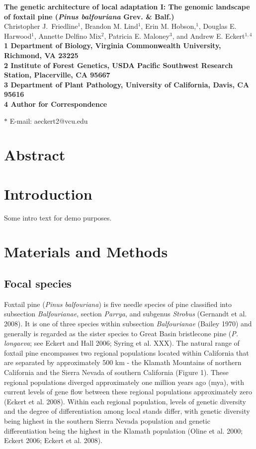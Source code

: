 \documentclass[11pt]{article}
\begin{document}
\begin{flushleft} 
{\Large \textbf{The genetic architecture of local adaptation I: The genomic landscape of foxtail 
pine (\textit{Pinus balfouriana} Grev. \& Balf.)}}
\\
Christopher J.\ Friedline$^{1}$, 
Brandon M. Lind$^{1}$,
Erin M. Hobson,$^{1}$,
Douglas E. Harwood$^{1}$, 
Annette Delfino Mix$^{2}$,
Patricia E. Maloney$^{3}$, and
Andrew E. Eckert$^{1,4}$
\\
\bf{1} Department of Biology, Virginia Commonwealth University, Richmond, VA 23225
\\
\bf{2} Institute of Forest Genetics, USDA Pacific Southwest Research Station, Placerville, 
CA 95667
\\
\bf{3} Department of Plant Pathology, University of California, Davis, CA 95616
\\
\bf{4} Author for Correspondence

$\ast$ E-mail: aeckert2@vcu.edu
\end{flushleft}

\section{Abstract}

\section{Introduction}
Some intro text for demo purposes.

\section{Materials and Methods}

\subsection{Focal species}
Foxtail pine (\textit{Pinus balfouriana}) is five needle species of pine classified into 
subsection \textit{Balfourianae}, section \textit{Parrya}, and subgenus \textit{Strobus} 
(Gernandt et al. 2008). It is one of three species within subsection \textit{Balfourianae} 
(Bailey 1970) and generally is 
regarded as the sister species to Great Basin bristlecone pine (\textit{P. longaeva}; see 
Eckert and Hall 2006; Syring et al. XXX). The natural range of foxtail pine encompasses two 
regional populations located within California that are separated by approximately 500 km - 
the Klamath Mountains of northern California and the Sierra Nevada of southern California 
(Figure 1). These regional populations diverged approximately one million years ago (mya), 
with current levels of gene flow between these regional populations approximately zero 
(Eckert et al. 2008). Within each regional population, levels of genetic diversity and the 
degree of differentiation among local stands differ, with genetic diversity being highest in 
the southern Sierra Nevada population and genetic differentiation being the highest in the 
Klamath population (Oline et al. 2000; Eckert 2006; Eckert et al. 2008).
\end{document}
